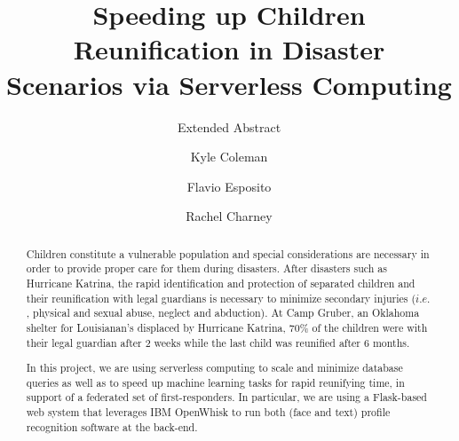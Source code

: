\documentclass[sigconf]{acmart}
\begin{document}
\title{Speeding up  Children Reunification in Disaster \\ Scenarios via Serverless Computing}
\subtitle{Extended Abstract}


\author{Kyle Coleman\superscript}
%
\author{Flavio Esposito}
%
\author{Rachel Charney}




\begin{abstract}
Children constitute a vulnerable population and special considerations are necessary in order to provide proper care for them during disasters. After disasters such as Hurricane Katrina, the rapid identification and protection of separated children and their reunification with legal guardians is necessary to minimize secondary injuries ($i.e.$, physical and sexual abuse, neglect and abduction). At Camp Gruber, an Oklahoma shelter for Louisianan's displaced by Hurricane Katrina, $70\%$ of the children were with their legal guardian after 2 weeks while the last child was reunified after 6 months. 

In this project, we are using serverless computing to scale and minimize database queries as well as to speed up machine learning tasks for rapid reunifying time, in support of a federated set of first-responders. In particular, we are using a Flask-based web system that leverages IBM OpenWhisk to run both (face and text) profile recognition software at the back-end.
\end{abstract}
\end{document}
